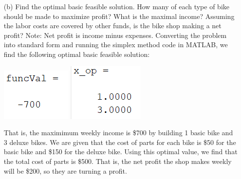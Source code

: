 \documentclass{article}
\begin{document}
\begin{itemize}
\begin{itemize}
        \item[(b)] Find the optimal basic feasible solution. How many of each type of bike should be made to maximize profit? What is the maximal income? Assuming the labor costs are covered by other funds, is the bike shop making a net profit? Note: Net profit is income minus expenses.
        \newline\newline
        Converting the problem into standard form and running the simplex method code in MATLAB, we find the following optimal basic feasible solution:
        \begin{center}
            \includegraphics{bikeShopMin}
            \includegraphics{bikeShopX}
        \end{center}
        That is, the maximimum weekly income is \$700 by building 1 basic bike and 3 deluxe bikes. We are given that the cost of parts for each bike is \$50 for the basic bike and \$150 for the deluxe bike. Using this optimal value, we find that the total cost of parts is \$500. That is, the net profit the shop makes weekly will be \$200, so they are turning a profit.
        \newline\newline



\end{itemize}
\end{itemize}
\end{document}
